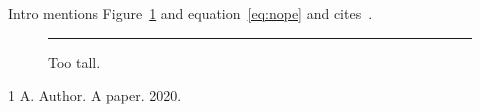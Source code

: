 \documentclass[twocolumn]{article}
\begin{document}
Intro mentions Figure~\ref{fig:huge} and equation~\eqref{eq:nope} and cites~\cite{nokey}.
\label{dup}


\label{dup}
\begin{figure}[h]
\centering\rule{1pt}{1.3\textheight}
\caption{Too tall.}\label{fig:huge}
\end{figure}
\begin{thebibliography}{1}
 A. Author. A paper. 2020.
\end{thebibliography}
\end{document}
